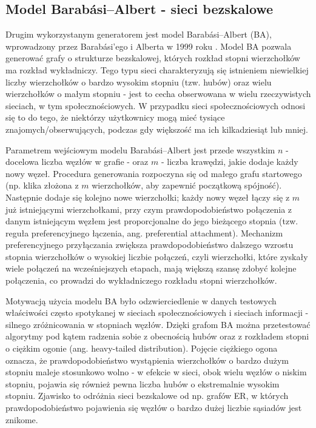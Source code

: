 \subsection{Model Barabási--Albert - sieci bezskalowe}
Drugim wykorzystanym generatorem jest model Barabási--Albert (BA), wprowadzony przez Barabási'ego i Alberta w 1999 roku \cite{barabasi1999emergence}. Model BA pozwala generować grafy o strukturze bezskalowej, których rozkład stopni wierzchołków ma rozkład wykładniczy. Tego typu sieci charakteryzują się istnieniem niewielkiej liczby wierzchołków o bardzo wysokim stopniu (tzw. hubów) oraz wielu wierzchołków o małym stopniu - jest to cecha obserwowana w wielu rzeczywistych sieciach, w tym społecznościowych. W przypadku sieci społecznościowych odnosi się to do tego, że niektórzy użytkownicy mogą mieć tysiące znajomych/obserwujących, podczas gdy większość ma ich kilkadziesiąt lub mniej.

Parametrem wejściowym modelu Barabási--Albert jest przede wszystkim $n$ - docelowa liczba węzłów w grafie - oraz $m$ - liczba krawędzi, jakie dodaje każdy nowy węzeł. Procedura generowania rozpoczyna się od małego grafu startowego (np. klika złożona z $m$ wierzchołków, aby zapewnić początkową spójność). Następnie dodaje się kolejno nowe wierzchołki; każdy nowy węzeł łączy się z $m$ już istniejącymi wierzchołkami, przy czym prawdopodobieństwo połączenia z danym istniejącym węzłem jest proporcjonalne do jego bieżącego stopnia (tzw. reguła preferencyjnego łączenia, ang. preferential attachment). Mechanizm preferencyjnego przyłączania zwiększa prawdopodobieństwo dalszego wzrostu stopnia wierzchołków o wysokiej liczbie połączeń, czyli wierzchołki, które zyskały wiele połączeń na wcześniejszych etapach, mają większą szansę zdobyć kolejne połączenia, co prowadzi do wykładniczego rozkładu stopni wierzchołków.

Motywacją użycia modelu BA było odzwierciedlenie w danych testowych właściwości często spotykanej w sieciach społecznościowych i sieciach informacji - silnego zróżnicowania w stopniach węzłów. Dzięki grafom BA można przetestować algorytmy pod kątem radzenia sobie z obecnością hubów oraz z rozkładem stopni o ciężkim ogonie (ang. heavy-tailed distribution). Pojęcie ciężkiego ogona oznacza, że prawdopodobieństwo wystąpienia wierzchołków o bardzo dużym stopniu maleje stosunkowo wolno - w efekcie w sieci, obok wielu węzłów o niskim stopniu, pojawia się również pewna liczba hubów o ekstremalnie wysokim stopniu. Zjawisko to odróżnia sieci bezskalowe od np. grafów ER, w których prawdopodobieństwo pojawienia się węzłów o bardzo dużej liczbie sąsiadów jest znikome.

